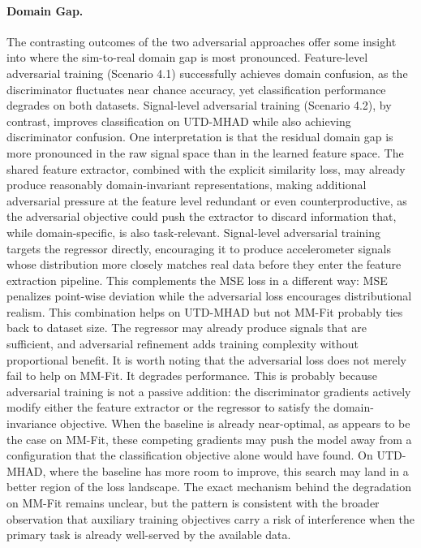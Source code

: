 \paragraph{Domain Gap.}
The contrasting outcomes of the two adversarial approaches offer some insight into where the sim-to-real domain gap is most pronounced. Feature-level adversarial training (Scenario 4.1)\cite{ganin2016domain} successfully achieves domain confusion, as the discriminator fluctuates near chance accuracy, yet classification performance degrades on both datasets. Signal-level adversarial training (Scenario 4.2)\cite{arjovsky2017wasserstein,gulrajani2017improved}, by contrast, improves classification on UTD-MHAD while also achieving discriminator confusion. One interpretation is that the residual domain gap is more pronounced in the raw signal space than in the learned feature space. The shared feature extractor, combined with the explicit similarity loss, may already produce reasonably domain-invariant representations, making additional adversarial pressure at the feature level redundant or even counterproductive, as the adversarial objective could push the extractor to discard information that, while domain-specific, is also task-relevant. Signal-level adversarial training targets the regressor directly, encouraging it to produce accelerometer signals whose distribution more closely matches real data before they enter the feature extraction pipeline. This complements the MSE loss in a different way: MSE penalizes point-wise deviation while the adversarial loss encourages distributional realism. This combination helps on UTD-MHAD but not MM-Fit probably ties back to dataset size. The regressor may already produce signals that are sufficient, and adversarial refinement adds training complexity without proportional benefit. It is worth noting that the adversarial loss does not merely fail to help on MM-Fit. It degrades performance. This is probably because adversarial training is not a passive addition: the discriminator gradients actively modify either the feature extractor or the regressor to satisfy the domain-invariance objective. When the baseline is already near-optimal, as appears to be the case on MM-Fit, these competing gradients may push the model away from a configuration that the classification objective alone would have found. On UTD-MHAD, where the baseline has more room to improve, this search may land in a better region of the loss landscape. The exact mechanism behind the degradation on MM-Fit remains unclear, but the pattern is consistent with the broader observation that auxiliary training objectives carry a risk of interference when the primary task is already well-served by the available data.


